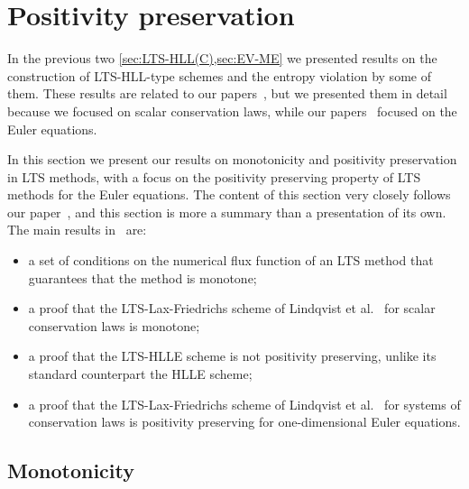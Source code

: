 
\section{Positivity preservation}
\label{sec:PP}

In the previous two \cref{sec:LTS-HLL(C),sec:EV-ME} we presented results on the construction of LTS-HLL-type schemes and the entropy violation by some of them. These results are related to our papers~\cite{cp2,jp2}, but we presented them in detail because we focused on scalar conservation laws, while our papers~\cite{cp2,jp2} focused on the Euler equations.

In this section we present our results on monotonicity and positivity preservation in LTS methods, with a focus on the positivity preserving property of LTS methods for the Euler equations. The content of this section very closely follows our paper~\cite{jp3}, and this section is more a summary than a presentation of its own. The main results in~\cite{jp3} are:
\begin{itemize}
\item a set of conditions on the numerical flux function of an LTS method that guarantees that the method is monotone;
\item a proof that the LTS-Lax-Friedrichs scheme of Lindqvist et al.~\cite{lin16} for scalar conservation laws is monotone;
\item a proof that the LTS-HLLE scheme is not positivity preserving, unlike its standard counterpart the HLLE scheme;
\item a proof that the LTS-Lax-Friedrichs scheme of Lindqvist et al.~\cite{lin16} for systems of conservation laws is positivity preserving for one-dimensional Euler equations.
\end{itemize}

\subsection{Monotonicity}


